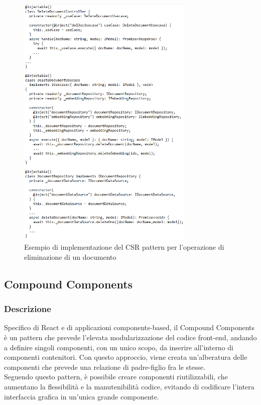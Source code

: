 \begin{figure}[h!]
    \centering  
    \includegraphics[width=0.75\textwidth]{CSR.png}
    \caption{Esempio di implementazione del CSR pattern per l'operazione di eliminazione di un documento}
\end{figure}

\newpage

\subsection{Compound Components}
\subsubsection{Descrizione}
Specifico di React e di applicazioni components-based, il Compound Components è un pattern che prevede l'elevata modularizzazione del codice front-end, andando a definire singoli componenti, con un unico scopo, da inserire all'interno di componenti contenitori. Con questo approccio, viene creata un'alberatura delle componenti che prevede una relazione di padre-figlio fra le stesse. \\Seguendo questo pattern, è possibile creare componenti riutilizzabili, che aumentano la flessibilità e la manutenibilità codice, evitando di codificare l'intera interfaccia grafica in un'unica grande componente. 
